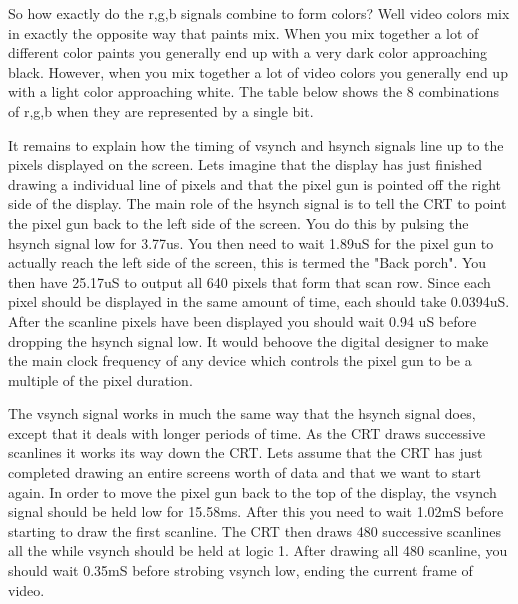 So how exactly do the r,g,b signals combine to form colors? Well 
video colors mix in exactly the opposite way that paints mix. When 
you mix together a lot of different color paints you generally end 
up with a very dark color approaching black. However, when you mix 
together a lot of video colors you generally end up with a light 
color approaching white. The table below shows the 8 combinations 
of r,g,b when they are represented by a single bit.

\begin{table}[ht]
\end{table}

It remains to explain how the timing of vsynch and hsynch signals 
line up to the pixels displayed on the screen.  Lets imagine that
the display has just finished drawing a individual line of pixels
and that the pixel gun is pointed off the right side of the display.
The main role of the hsynch signal is to tell the CRT to point the
pixel gun back to the left side of the screen.  You do this by pulsing
the hsynch signal low for 3.77us.  You then need to wait 1.89uS for
the pixel gun to actually reach the left side of the screen, this is
termed the "Back porch".  You then have 25.17uS to output all 640 pixels
that form that scan row.  Since each pixel should be displayed in
the same amount of time, each should take 0.0394uS.  After the scanline
pixels have been displayed you should wait 0.94 uS before dropping
the hsynch signal low.  It would behoove the digital designer to make
the main clock frequency of any device which controls the pixel gun to
be a multiple of the pixel duration.

The vsynch signal works in much the same way that the hsynch signal
does, except that it deals with longer periods of time.  As the CRT
draws successive scanlines it works its way down the CRT.  Lets assume
that the CRT has just completed drawing an entire screens worth of
data and that we want to start again.  In order to move the pixel gun
back to the top of the display, the vsynch signal should be held low
for 15.58ms.  After this you need to wait 1.02mS before starting to
draw the first scanline.  The CRT then draws 480 successive scanlines
all the while vsynch should be held at logic 1.  After drawing all 480
scanline, you should wait 0.35mS before strobing vsynch low, ending the
current frame of video.

